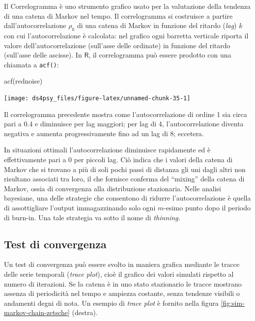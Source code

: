 \documentclass[
  11pt,
]{krantz}
\makeatletter
\newenvironment{Shaded}{\begin{snugshade}}{\end{snugshade}}
\newcommand{\FunctionTok}[1]{\textcolor[rgb]{0,0,0}{#1}}
\newcommand{\NormalTok}[1]{#1}
\newenvironment{kframe}{%
\medskip{}
\setlength{\fboxsep}{.8em}
 \def\at@end@of@kframe{}%
 \ifinner\ifhmode%
  \def\at@end@of@kframe{\end{minipage}}%
  \begin{minipage}{\columnwidth}%
 \fi\fi%
 \def\FrameCommand##1{\hskip\@totalleftmargin \hskip-\fboxsep
 \colorbox{shadecolor}{##1}\hskip-\fboxsep
     \hskip-\linewidth \hskip-\@totalleftmargin \hskip\columnwidth}%
 \MakeFramed {\advance\hsize-\width
   \@totalleftmargin\z@ \linewidth\hsize
   \@setminipage}}%
 {\par\unskip\endMakeFramed%
 \at@end@of@kframe}
\renewenvironment{Shaded}{\begin{kframe}}{\end{kframe}}
\newcommand{\R}{\textsf{R}} %
\theoremstyle{definition}
\theoremstyle{definition}
\theoremstyle{definition}
\theoremstyle{definition}
\theoremstyle{remark}
\makeatother
\begin{document}
Il Correlogramma è uno strumento grafico usato per la valutazione della tendenza di una catena di Markov nel tempo. Il correlogramma si costruisce a partire dall'autocorrelazione \(\rho_k\) di una catena di Markov in funzione del ritardo (\emph{lag}) \(k\) con cui l'autocorrelazione è calcolata: nel grafico ogni barretta verticale riporta il valore dell'autocorrelazione (sull'asse delle ordinate) in funzione del ritardo (sull'asse delle ascisse). In \(\R\), il correlogramma può essere prodotto con una chiamata a \texttt{acf()}:

\begin{Shaded}
\begin{Highlighting}[]
\FunctionTok{acf}\NormalTok{(rednoise)}
\end{Highlighting}
\end{Shaded}

\begin{center}\texttt{[image: ds4psy\_files/figure-latex/unnamed-chunk-35-1]} \end{center}

Il correlogramma precedente mostra come l'autocorrelazione di ordine 1 sia circa pari a 0.4 e diminuisce per lag maggiori; per lag di 4, l'autocorrelazione diventa negativa e aumenta progressivamente fino ad un lag di 8; eccetera.

In situazioni ottimali l'autocorrelazione diminuisce rapidamente ed è effettivamente pari a 0 per piccoli lag. Ciò indica che i valori della catena di Markov che si trovano a più di soli pochi passi di distanza gli uni dagli altri non risultano associati tra loro, il che fornisce conferma del ``mixing'' della catena di Markov, ossia di convergenza alla distribuzione stazionaria. Nelle analisi bayesiane, una delle strategie che consentono di ridurre l'autocorrelazione è quella di assottigliare l'output immagazzinando solo ogni \(m\)-esimo punto dopo il periodo di burn-in. Una tale strategia va sotto il nome di \emph{thinning}.

\hypertarget{test-di-convergenza}{%
\subsection{Test di convergenza}\label{test-di-convergenza}}

Un test di convergenza può essere svolto in maniera grafica mediante le tracce delle serie temporali (\emph{trace plot}), cioè il grafico dei valori simulati rispetto al numero di iterazioni. Se la catena è in uno stato stazionario le tracce mostrano assenza di periodicità nel tempo e ampiezza costante, senza tendenze visibili o andamenti degni di nota. Un esempio di \emph{trace plot} è fornito nella figura \ref{fig:sim-markov-chain-zetsche} (destra).
\end{document}
